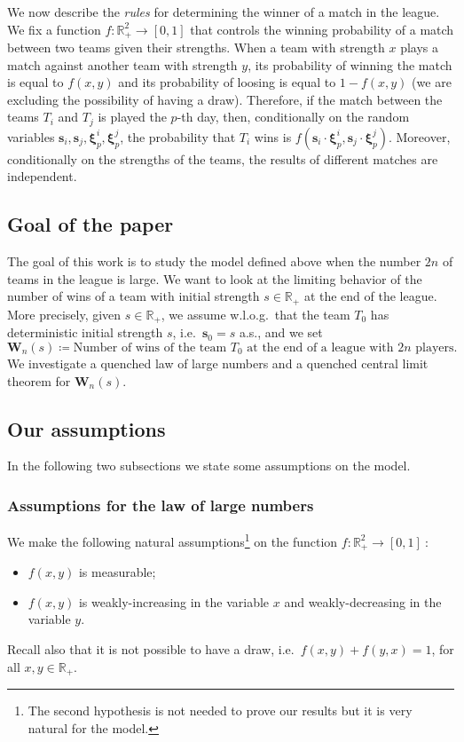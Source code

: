 \documentclass[11pt,a4paper,oneside]{article}
\theoremstyle{definition}
\theoremstyle{remark}
\def\R{\mathbb{R}}
\begin{document}
We now describe the \emph{rules} for determining the winner of a match in the league. We fix a function $f:\mathbb R_+^2\to[0,1]$ that controls the winning probability of a match between two teams given their strengths. When a team with strength $x$ plays a match against another team with strength $y$, its probability of winning the match is equal to $f(x,y)$ and its probability of loosing is equal to $1-f(x,y)$ (we are excluding the possibility of having a draw). Therefore, if the match between the teams $T_i$ and $T_j$ is played the $p$-th day, then, conditionally on the random variables $\bm s_i, \bm s_j,\bm \xi^i_p,\bm \xi^j_p$, the probability that $T_i$ wins is $f(\bm s_i\cdot \bm \xi^i_p,\bm s_j\cdot \bm \xi^j_p)$.
Moreover, conditionally on the strengths of the teams, the results of different matches are independent. 


\subsection{Goal of the paper}


The goal of this work is to study the model defined above when the number $2n$ of teams in the league is large. We want to look at the limiting behavior of the number of wins of a team with initial strength $s\in \R_+$ at the end of the league. More precisely, given $s\in \R_+$, we assume w.l.o.g.\ that the team $T_{0}$ has deterministic initial strength $s$, i.e.\ $\bm s_{0}=s$ a.s., and we set
\begin{equation}
 \bm W_n(s)\coloneqq\text{Number of wins of the team }T_{0}\text{ at the end of a league with $2n$ players}.
\end{equation}
We investigate a quenched law of large numbers and a quenched central limit theorem for $\bm W_n(s)$.
\subsection{Our assumptions}

In the following two subsections we state some assumptions on the model.

\subsubsection{Assumptions for the law of large numbers}\label{ass:LLN}

We make the following natural assumptions\footnote{The second hypothesis is not needed to prove our results but it is very natural for the model.} on the function $f:\mathbb R_+^2\to[0,1]\:$:
\begin{itemize}
	\item $f(x,y)$ is measurable;
	\item $f(x,y)$ is weakly-increasing in the variable $x$ and weakly-decreasing in the variable $y$.	
\end{itemize}
Recall also that it is not possible to have a draw, i.e.\ $f(x,y)+f(y,x)=1$, for all $x,y\in \R_+$.
\end{document}

